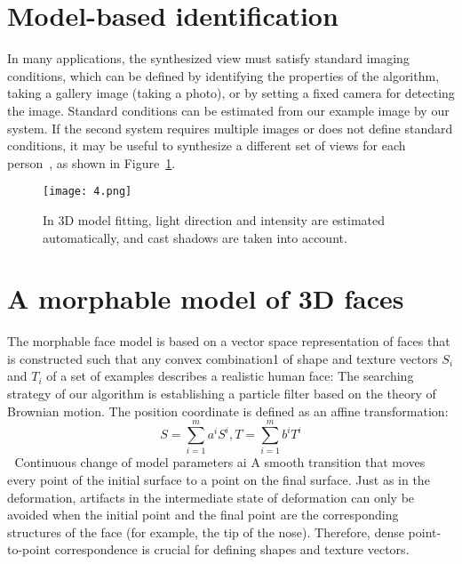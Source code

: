 \documentclass[10pt,twocolumn,letterpaper]{article}
\begin{document}
\section{Model-based identification}
In many applications, the synthesized view must satisfy standard imaging conditions, which can be defined by identifying the properties of the algorithm, taking a gallery image (taking a photo), or by setting a fixed camera for detecting the image. Standard conditions can be estimated from our example image by our system. If the second system requires multiple images or does not define standard conditions, it may be useful to synthesize a different set of views for each person~\cite{Kemelmachershlizerman2011Face}, as shown in Figure~\ref{fig:1}.

\begin{figure}[!htb]
\begin{center}
\texttt{[image: 4.png]}
\end{center}
\caption{In 3D model fitting, light direction and intensity are estimated automatically, and cast shadows are taken into account.}
\label{fig:1}
\end{figure}
\section {A  morphable model of 3D faces}
The morphable face model is based on a vector space representation of faces that is constructed such that any convex combination1 of shape and texture vectors $S_i$ and $T_i$ of a set of examples describes a realistic human face:
The searching strategy of our algorithm is establishing a particle filter based on the theory of Brownian motion. The position coordinate is defined as an affine transformation:
\begin{equation}
S=\sum_{i=1}^m a^iS^i, T=\sum_{i=1}^m b^iT^i
\end{equation} 
Continuous change of model parameters ai
A smooth transition that moves every point of the initial surface to a point on the final surface. Just as in the deformation, artifacts in the intermediate state of deformation can only be avoided when the initial point and the final point are the corresponding structures of the face (for example, the tip of the nose). Therefore, dense point-to-point correspondence is crucial for defining shapes and texture vectors.

{\small


}
\end{document}
